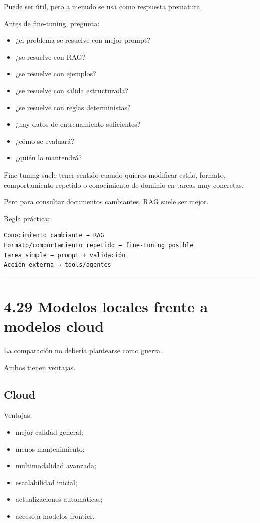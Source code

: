 Puede ser útil, pero a menudo se usa como respuesta prematura.

Antes de fine-tuning, pregunta:

\begin{itemize}
\tightlist
\item
  ¿el problema se resuelve con mejor prompt?
\item
  ¿se resuelve con RAG?
\item
  ¿se resuelve con ejemplos?
\item
  ¿se resuelve con salida estructurada?
\item
  ¿se resuelve con reglas deterministas?
\item
  ¿hay datos de entrenamiento suficientes?
\item
  ¿cómo se evaluará?
\item
  ¿quién lo mantendrá?
\end{itemize}

Fine-tuning suele tener sentido cuando quieres modificar estilo,
formato, comportamiento repetido o conocimiento de dominio en tareas muy
concretas.

Pero para consultar documentos cambiantes, RAG suele ser mejor.

Regla práctica:

\begin{lstlisting}
Conocimiento cambiante → RAG
Formato/comportamiento repetido → fine-tuning posible
Tarea simple → prompt + validación
Acción externa → tools/agentes
\end{lstlisting}

\begin{center}\rule{0.5\linewidth}{0.5pt}\end{center}

\section{4.29 Modelos locales frente a modelos
cloud}\label{modelos-locales-frente-a-modelos-cloud}

La comparación no debería plantearse como guerra.

Ambos tienen ventajas.

\subsection{Cloud}\label{cloud}

Ventajas:

\begin{itemize}
\tightlist
\item
  mejor calidad general;
\item
  menos mantenimiento;
\item
  multimodalidad avanzada;
\item
  escalabilidad inicial;
\item
  actualizaciones automáticas;
\item
  acceso a modelos frontier.
\end{itemize}

